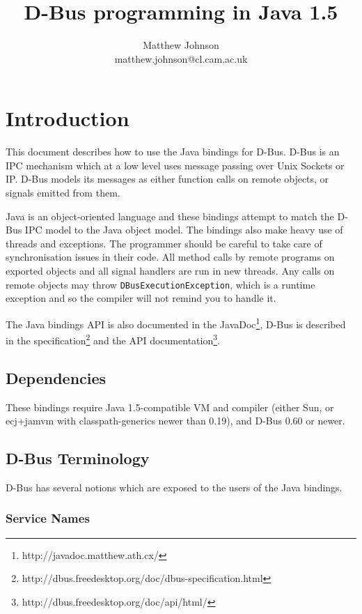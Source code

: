 \documentclass[a4paper,12pt]{article}
\author{Matthew Johnson\\matthew.johnson@cl.cam.ac.uk}
\title{D-Bus programming in Java 1.5}
\begin{document}
\def\javadocroot/{http://javadoc.matthew.ath.cx/}

\maketitle

\tableofcontents
\listoffigures
\listoftables

\section{Introduction}

This document describes how to use the Java bindings for D-Bus. D-Bus
is an IPC mechanism which at a low level uses message passing over
Unix Sockets or IP. D-Bus models its messages as either function
calls on remote objects, or signals emitted from them.

Java is an object-oriented language and these bindings attempt to
match the D-Bus IPC model to the Java object model. The bindings also
make heavy use of threads and exceptions. The programmer should be
careful to take care of synchronisation issues in their code. All
method calls by remote programs on exported objects and all signal
handlers are run in new threads. Any calls on remote objects may
throw {\tt DBusExecutionException}, which is a runtime exception and
so the compiler will not remind you to handle it.

The Java bindings API is also documented in the
JavaDoc\footnote{\javadocroot/}, D-Bus is
described in the
specification\footnote{http://dbus.freedesktop.org/doc/dbus-specification.html}
and the API
documentation\footnote{http://dbus.freedesktop.org/doc/api/html/}.

\subsection{Dependencies}

These bindings require Java 1.5-compatible VM and compiler (either
Sun, or ecj+jamvm with classpath-generics newer than 0.19), and D-Bus
0.60 or newer.

\subsection{D-Bus Terminology}

D-Bus has several notions which are exposed to the users of the Java
bindings.

\subsubsection{Service Names}
\end{document}
